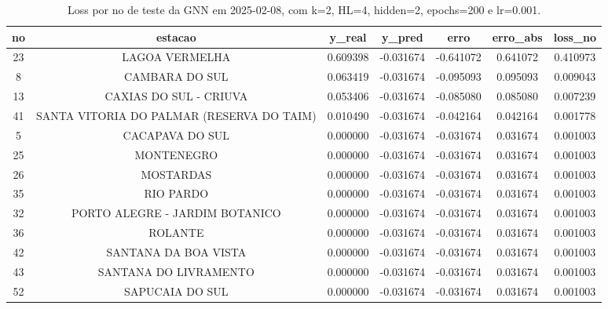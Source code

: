 \begin{table}[h]
\centering
\caption{Loss por no de teste da GNN em 2025-02-08, com k=2, HL=4, hidden=2, epochs=200 e lr=0.001.}
\label{tab:gnn_loss_k2_hl4_h2_e200_d20250208}
\begin{tabular}{ccccccc}
\toprule
no & estacao & y\_real & y\_pred & erro & erro\_abs & loss\_no \\
\midrule
23 & LAGOA VERMELHA & 0.609398 & -0.031674 & -0.641072 & 0.641072 & 0.410973 \\
8 & CAMBARA DO SUL & 0.063419 & -0.031674 & -0.095093 & 0.095093 & 0.009043 \\
13 & CAXIAS DO SUL - CRIUVA & 0.053406 & -0.031674 & -0.085080 & 0.085080 & 0.007239 \\
41 & SANTA VITORIA DO PALMAR (RESERVA DO TAIM) & 0.010490 & -0.031674 & -0.042164 & 0.042164 & 0.001778 \\
5 & CACAPAVA DO SUL & 0.000000 & -0.031674 & -0.031674 & 0.031674 & 0.001003 \\
25 & MONTENEGRO & 0.000000 & -0.031674 & -0.031674 & 0.031674 & 0.001003 \\
26 & MOSTARDAS & 0.000000 & -0.031674 & -0.031674 & 0.031674 & 0.001003 \\
35 & RIO PARDO & 0.000000 & -0.031674 & -0.031674 & 0.031674 & 0.001003 \\
32 & PORTO ALEGRE - JARDIM BOTANICO & 0.000000 & -0.031674 & -0.031674 & 0.031674 & 0.001003 \\
36 & ROLANTE & 0.000000 & -0.031674 & -0.031674 & 0.031674 & 0.001003 \\
42 & SANTANA DA BOA VISTA & 0.000000 & -0.031674 & -0.031674 & 0.031674 & 0.001003 \\
43 & SANTANA DO LIVRAMENTO & 0.000000 & -0.031674 & -0.031674 & 0.031674 & 0.001003 \\
52 & SAPUCAIA DO SUL & 0.000000 & -0.031674 & -0.031674 & 0.031674 & 0.001003 \\
\bottomrule
\end{tabular}
\end{table}
